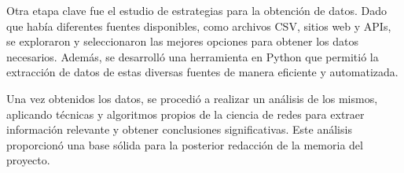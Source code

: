 Otra etapa clave fue el estudio de estrategias para la obtención de datos. Dado que había 
diferentes fuentes disponibles, como archivos CSV, sitios web y APIs, se exploraron y 
seleccionaron las mejores opciones para obtener los datos necesarios. Además, se desarrolló 
una herramienta en Python que permitió la extracción de datos de estas diversas fuentes de 
manera eficiente y automatizada.

Una vez obtenidos los datos, se procedió a realizar un análisis de los mismos, aplicando técnicas 
y algoritmos propios de la ciencia de redes para extraer información relevante y obtener conclusiones 
significativas. Este análisis proporcionó una base sólida para la posterior redacción de la memoria 
del proyecto.